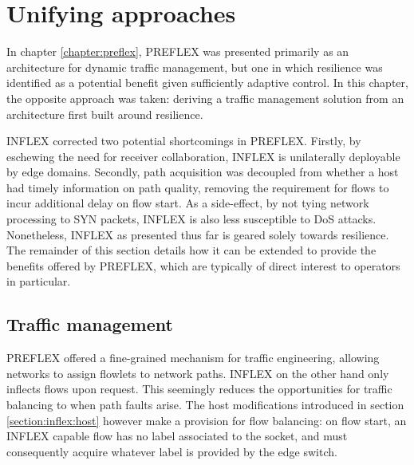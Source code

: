 \section{Unifying approaches}
\label{section:inflex:discussion}

In chapter \ref{chapter:preflex}, \ac{PREFLEX} was presented primarily as an architecture for dynamic traffic management, but one in which resilience was identified as a potential benefit given sufficiently adaptive control.
In this chapter, the opposite approach was taken: deriving a traffic management solution from an architecture first built around resilience.

INFLEX corrected two potential shortcomings in PREFLEX.
Firstly, by eschewing the need for receiver collaboration, INFLEX is unilaterally deployable by edge domains.
Secondly, path acquisition was decoupled from whether a host had timely information on path quality, removing the requirement for flows to incur additional delay on flow start.
As a side-effect, by not tying network processing to SYN packets, INFLEX is also less susceptible to \ac{DoS} attacks.
Nonetheless, INFLEX as presented thus far is geared solely towards resilience.
The remainder of this section details how it can be extended to provide the benefits offered by \ac{PREFLEX}, which are typically of direct interest to operators in particular.

\subsection{Traffic management}

\ac{PREFLEX} offered a fine-grained mechanism for traffic engineering, allowing networks to assign flowlets to network paths.
INFLEX on the other hand only inflects flows upon request. 
This seemingly reduces the opportunities for traffic balancing to when path faults arise.
The host modifications introduced in section \ref{section:inflex:host} however make a provision for flow balancing: on flow start, an INFLEX capable flow has no label associated to the socket, and must consequently acquire whatever label is provided by the edge switch.

